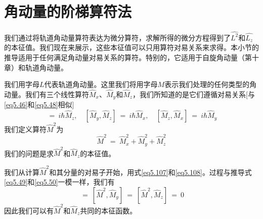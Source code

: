 \documentclass[12pt,a4paper,openany]{ctexbook}
\begin{document}
\section{角动量的阶梯算符法}
\begin{flushleft}
    \setlength{\parindent}{2em}
我们通过将轨道角动量算符表达为微分算符，求解所得的微分方程得到了$\hat{L^2}$和$\hat{L_z}$的本征值。我们现在来展示，这些本征值可以只用算符对易关系来求得。本小节的推导适用于任何满足角动量对易关系的算符。特别的，它适用于自旋角动量（第十章）和轨道角动量。

我们用字母$L$代表轨道角动量。这里我们将用字母$M$表示我们处理的任何类型的角动量。我们有三个线性算符$\hat{M}_x$、$\hat{M}_y$和$\hat{M}_z$，我们所知道的是它们遵循对易关系[与\eqref{eq5.46}和\eqref{eq5.48}相似]
\begin{equation}
    [\hat{M}_x,\hat{M}_y]\ =\ i\hbar\hat{M}_z,\quad[\hat{M}_y,\hat{M}_z]\ =\ i\hbar\hat{M}_x,\quad[\hat{M}_z,\hat{M}_x]\ =\ i\hbar\hat{M}_y \label{eq5.107}
\end{equation}
我们定义算符$\hat{M}^2$为
\begin{equation}
    \hat{M}^2\ =\ \hat{M}_x^2+\hat{M}_y^2+\hat{M}_z^2 \label{eq5.108}
\end{equation}
我们的问题是求$\hat{M}^2$和$\hat{M}_z$的本征值。

我们从计算$\hat{M}^2$和其分量的对易子开始，用式\eqref{eq5.107}和\eqref{eq5.108}。过程与推导式\eqref{eq5.49}和\eqref{eq5.50}一模一样，我们有
\begin{equation}
    [\hat{M}^2,\hat{M}_x]\ =\ [\hat{M}^2,\hat{M}_y]\ =\ [\hat{M}^2,\hat{M}_z]\ =\ 0 \label{eq5.109}
\end{equation}
因此我们可以有$\hat{M}^2$和$\hat{M}_z$共同的本征函数。


\end{flushleft}
\end{document}
